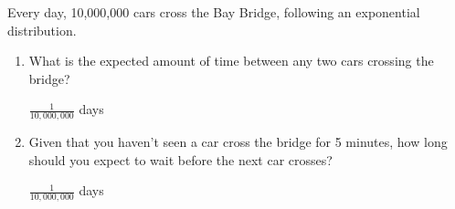 \question Every day, 10,000,000 cars cross the Bay Bridge, following an 
exponential distribution. 
\begin{enumerate}[label=(\alph*.)]
\item What is the expected amount of time between 
any two cars crossing the bridge?
\begin{solution}[0.5 cm]
$\frac{1}{10,000,000}$ days
\end{solution}

\item Given that you haven’t seen a car cross the bridge for 5 minutes, how 
long should you expect to wait before the next car crosses?
\begin{solution}[0.5cm]
$\frac{1}{10,000,000}$ days
\end{solution}  
\end{enumerate}